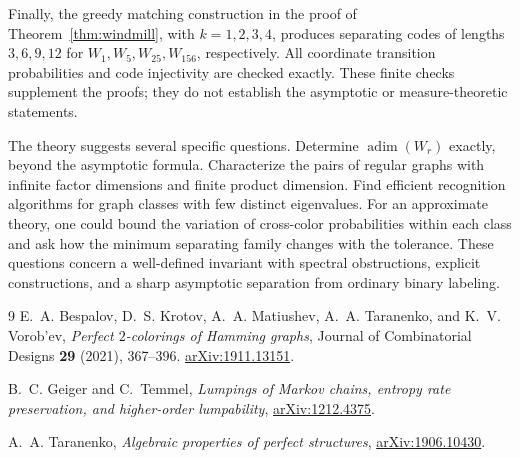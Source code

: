 \documentclass[11pt]{article}
\theoremstyle{definition}
\newcommand{\adim}{\operatorname{adim}}
\numberwithin{equation}{section}
\begin{document}
Finally, the greedy matching construction in the proof of
Theorem~\ref{thm:windmill}, with $k=1,2,3,4$, produces separating codes
of lengths $3,6,9,12$ for $W_1,W_5,W_{25},W_{156}$, respectively.
All coordinate transition probabilities and code injectivity are checked
exactly. These finite checks supplement the proofs; they do not establish
the asymptotic or measure-theoretic statements.

The theory suggests several specific questions. Determine $\adim(W_r)$
exactly, beyond the asymptotic formula. Characterize the pairs of regular
graphs with infinite factor dimensions and finite product dimension.
Find efficient recognition algorithms for graph classes with few distinct
eigenvalues. For an approximate theory, one could bound the variation of
cross-color probabilities within each class and ask how the minimum
separating family changes with the tolerance. These questions concern a
well-defined invariant with spectral obstructions, explicit constructions,
and a sharp asymptotic separation from ordinary binary labeling.

\begin{thebibliography}{9}
E.~A. Bespalov, D.~S. Krotov, A.~A. Matiushev, A.~A. Taranenko,
and K.~V. Vorob'ev,
\emph{Perfect $2$-colorings of Hamming graphs},
Journal of Combinatorial Designs \textbf{29} (2021), 367--396.
\href{https://arxiv.org/abs/1911.13151}{arXiv:1911.13151}.

B.~C. Geiger and C.~Temmel,
\emph{Lumpings of Markov chains, entropy rate preservation, and
higher-order lumpability},
\href{https://arxiv.org/abs/1212.4375}{arXiv:1212.4375}.

A.~A. Taranenko,
\emph{Algebraic properties of perfect structures},
\href{https://arxiv.org/abs/1906.10430}{arXiv:1906.10430}.
\end{thebibliography}
\end{document}
